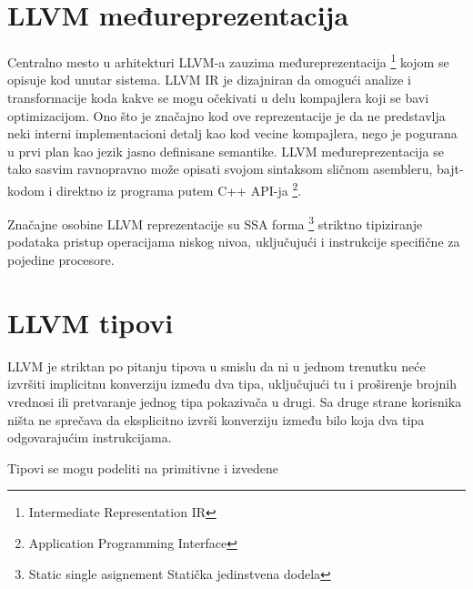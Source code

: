 \section{LLVM međureprezentacija}


Centralno mesto u arhitekturi LLVM-a\cite{aosa} zauzima međureprezentacija
\footnote{\eng Intermediate Representation \ndash IR} 
kojom se opisuje kod unutar sistema. 
LLVM IR je dizajniran da omogući analize i transformacije koda kakve se mogu očekivati u delu kompajlera koji se bavi optimizacijom. 
Ono što je značajno kod ove reprezentacije je da ne predstavlja neki interni implementacioni detalj kao kod vecine kompajlera, 
nego je pogurana u prvi plan kao jezik jasno definisane semantike. 
LLVM međureprezentacija se tako sasvim ravnopravno može opisati svojom sintaksom sličnom asembleru, 
bajt-kodom i direktno iz programa putem C++ API-ja
\footnote{\eng Application Programming Interface}.

Značajne osobine LLVM reprezentacije su 
SSA forma
\footnote{\skr \eng Static single asignement \ndash Statička jedinstvena dodela}
striktno tipiziranje podataka
pristup operacijama niskog nivoa, uključujući i instrukcije specifične za pojedine procesore.

\section{LLVM tipovi}

LLVM je striktan po pitanju tipova u smislu da ni u jednom trenutku neće izvršiti implicitnu konverziju između dva tipa, 
uključujući tu i proširenje brojnih vrednosi ili pretvaranje jednog tipa pokazivača u drugi. 
Sa druge strane korisnika ništa ne sprečava da eksplicitno izvrši konverziju između bilo koja dva tipa odgovarajućim instrukcijama.

Tipovi se mogu podeliti na primitivne i izvedene

